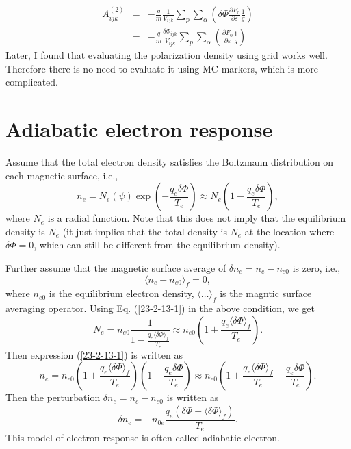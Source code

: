 \documentclass{article}
\begin{document}
\begin{eqnarray*}
  A_{i j k}^{(2)} & = & - \frac{q}{m} \frac{1}{V_{i j k}} \sum_p \sum_{\alpha}
  \left( \delta \Phi \frac{\partial F_0}{\partial \varepsilon} \frac{1}{g}
  \right)\\
  & = & - \frac{q}{m} \frac{\delta \Phi_{i j k}}{V_{i j k}} \sum_p
  \sum_{\alpha} \left( \frac{\partial F_0}{\partial \varepsilon} \frac{1}{g}
  \right)
\end{eqnarray*}
Later, I found that evaluating the polarization density using grid works well.
Therefore there is no need to evaluate it using MC markers, which is more
complicated.

\appendix\section{Adiabatic electron response}

Assume that the total electron density satisfies the Boltzmann distribution on
each magnetic surface, i.e.,
\begin{equation}
  \label{23-2-13-1} n_e = N_e (\psi) \exp \left( - \frac{q_e \delta \Phi}{T_e}
  \right) \approx N_e \left( 1 - \frac{q_e \delta \Phi}{T_e} \right),
\end{equation}
where $N_e$ is a radial function. Note that this does not imply that the
equilibrium density is $N_e$ (it just implies that the total density is $N_e$
at the location where $\delta \Phi = 0$, which can still be different from the
equilibrium density).

Further assume that the magnetic surface average of $\delta n_e = n_e - n_{e
0}$ is zero, i.e.,
\begin{equation}
  \langle n_e - n_{e 0} \rangle_f = 0,
\end{equation}
where $n_{e 0}$ is the equilibrium electron density, $\langle \ldots
\rangle_f$ is the magntic surface averaging operator. Using Eq.
(\ref{23-2-13-1}) in the above condition, we get
\begin{equation}
  N_e = n_{e 0} \frac{1}{1 - \frac{q_e \langle \delta \Phi \rangle_f}{T_e}}
  \approx n_{e 0} \left( 1 + \frac{q_e \langle \delta \Phi \rangle_f}{T_e}
  \right) .
\end{equation}
Then expression (\ref{23-2-13-1}) is written as
\begin{equation}
  n_e = n_{e 0} \left( 1 + \frac{q_e \langle \delta \Phi \rangle_f}{T_e}
  \right) \left( 1 - \frac{q_e \delta \Phi}{T_e} \right) \approx n_{e 0}
  \left( 1 + \frac{q_e \langle \delta \Phi \rangle_f}{T_e} - \frac{q_e \delta
  \Phi}{T_e} \right) .
\end{equation}
Then the perturbation $\delta n_e = n_e - n_{e 0}$ is written as
\begin{equation}
  \label{23-3-10-1} \delta n_e = - n_{0 e} \frac{q_e (\delta \Phi - \langle
  \delta \Phi \rangle_f)}{T_e} .
\end{equation}
This model of electron response is often called adiabatic electron.
\end{document}
